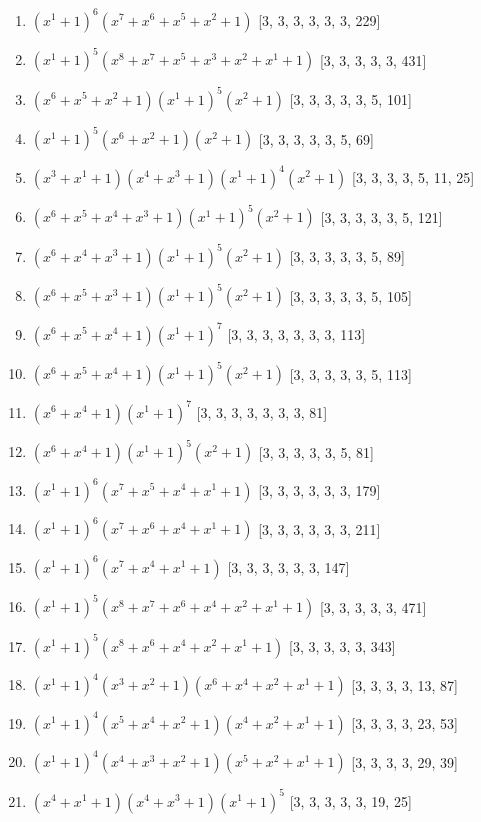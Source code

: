 \documentclass[10pt,twocolumn]{article}
\begin{document}
\begin{enumerate}
\item $(x^{1} + 1)^{6}(x^{7} + x^{6} + x^{5} + x^{2} + 1)$  [3, 3, 3, 3, 3, 3, 229]
\item $(x^{1} + 1)^{5}(x^{8} + x^{7} + x^{5} + x^{3} + x^{2} + x^{1} + 1)$  [3, 3, 3, 3, 3, 431]
\item $(x^{6} + x^{5} + x^{2} + 1)(x^{1} + 1)^{5}(x^{2} + 1)$  [3, 3, 3, 3, 3, 5, 101]
\item $(x^{1} + 1)^{5}(x^{6} + x^{2} + 1)(x^{2} + 1)$  [3, 3, 3, 3, 3, 5, 69]
\item $(x^{3} + x^{1} + 1)(x^{4} + x^{3} + 1)(x^{1} + 1)^{4}(x^{2} + 1)$  [3, 3, 3, 3, 5, 11, 25]
\item $(x^{6} + x^{5} + x^{4} + x^{3} + 1)(x^{1} + 1)^{5}(x^{2} + 1)$  [3, 3, 3, 3, 3, 5, 121]
\item $(x^{6} + x^{4} + x^{3} + 1)(x^{1} + 1)^{5}(x^{2} + 1)$  [3, 3, 3, 3, 3, 5, 89]
\item $(x^{6} + x^{5} + x^{3} + 1)(x^{1} + 1)^{5}(x^{2} + 1)$  [3, 3, 3, 3, 3, 5, 105]
\item $(x^{6} + x^{5} + x^{4} + 1)(x^{1} + 1)^{7}$  [3, 3, 3, 3, 3, 3, 3, 113]
\item $(x^{6} + x^{5} + x^{4} + 1)(x^{1} + 1)^{5}(x^{2} + 1)$  [3, 3, 3, 3, 3, 5, 113]
\item $(x^{6} + x^{4} + 1)(x^{1} + 1)^{7}$  [3, 3, 3, 3, 3, 3, 3, 81]
\item $(x^{6} + x^{4} + 1)(x^{1} + 1)^{5}(x^{2} + 1)$  [3, 3, 3, 3, 3, 5, 81]
\item $(x^{1} + 1)^{6}(x^{7} + x^{5} + x^{4} + x^{1} + 1)$  [3, 3, 3, 3, 3, 3, 179]
\item $(x^{1} + 1)^{6}(x^{7} + x^{6} + x^{4} + x^{1} + 1)$  [3, 3, 3, 3, 3, 3, 211]
\item $(x^{1} + 1)^{6}(x^{7} + x^{4} + x^{1} + 1)$  [3, 3, 3, 3, 3, 3, 147]
\item $(x^{1} + 1)^{5}(x^{8} + x^{7} + x^{6} + x^{4} + x^{2} + x^{1} + 1)$  [3, 3, 3, 3, 3, 471]
\item $(x^{1} + 1)^{5}(x^{8} + x^{6} + x^{4} + x^{2} + x^{1} + 1)$  [3, 3, 3, 3, 3, 343]
\item $(x^{1} + 1)^{4}(x^{3} + x^{2} + 1)(x^{6} + x^{4} + x^{2} + x^{1} + 1)$  [3, 3, 3, 3, 13, 87]
\item $(x^{1} + 1)^{4}(x^{5} + x^{4} + x^{2} + 1)(x^{4} + x^{2} + x^{1} + 1)$  [3, 3, 3, 3, 23, 53]
\item $(x^{1} + 1)^{4}(x^{4} + x^{3} + x^{2} + 1)(x^{5} + x^{2} + x^{1} + 1)$  [3, 3, 3, 3, 29, 39]
\item $(x^{4} + x^{1} + 1)(x^{4} + x^{3} + 1)(x^{1} + 1)^{5}$  [3, 3, 3, 3, 3, 19, 25]

\end{enumerate}
\end{document}
